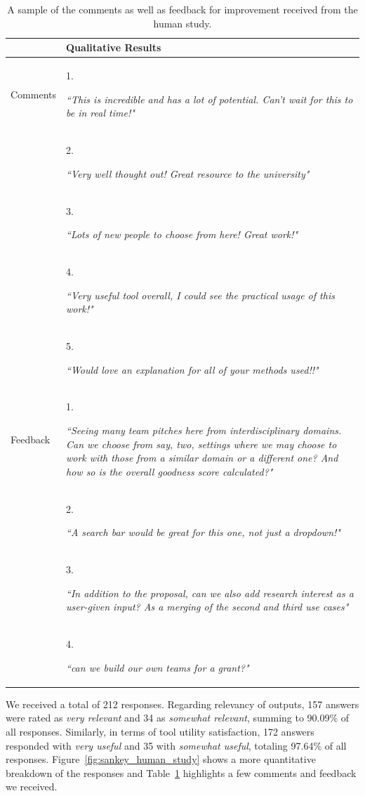 \begin{table}[ht]
{\renewcommand\arraystretch{1.25}
{\begin{tabular}{l|l|l} \hline
& \multicolumn{2}{l}{Qualitative Results} \\ \hline
Comments & \multicolumn{2}{p{6cm}}{1. \raggedright \textit{``This is incredible and has a lot of potential. Can't wait for this to be in real time!"}} \\ 
 & \multicolumn{2}{p{6cm}}{2. \raggedright \textit{``Very well thought out! Great resource to the university"}} \\ 
 & \multicolumn{2}{p{6cm}}{3. \raggedright \textit{``Lots of new people to choose from here! Great work!"}} \\ 
 & \multicolumn{2}{p{6cm}}{4. \raggedright \textit{``Very useful tool  overall, I could see the practical usage of this work!"}} \\ 
 & \multicolumn{2}{p{6cm}}{5. \raggedright \textit{``Would love an explanation for all of your methods used!!"}} \\ 
 \hline
Feedback & \multicolumn{2}{p{6cm}}{1. \raggedright \textit{``Seeing many team pitches here from interdisciplinary domains. Can we choose from say, two, settings where we may choose to work with those from a similar domain or a different one? And how so is the overall goodness score calculated?"}} \\ 
 & \multicolumn{2}{p{6cm}}{2. \raggedright \textit{``A search bar would be great for this one, not just a dropdown!"}} \\ 
 & \multicolumn{2}{p{6cm}}{3. \raggedright \textit{``In addition to the proposal, can we also add research interest as a user-given input? As a merging of the second and third use cases"}} \\ 
 & \multicolumn{2}{p{6cm}}{4. \raggedright \textit{``can we build our own teams for a grant?"}} \\ 
 
\hline
\end{tabular}}}
\caption{A sample of the comments as well as feedback for improvement received from the human study.} \label{tab:comments_feedback}
\end{table}

We received a total of 212 responses. Regarding relevancy of outputs, 157 answers were rated as \textit{very relevant} and 34 as \textit{somewhat relevant}, summing to 90.09\% of all responses. Similarly, in terms of tool utility satisfaction, 172 answers responded with \textit{very useful} and 35 with \textit{somewhat useful}, totaling 97.64\% of all responses. Figure~\ref{fig:sankey_human_study} shows a more quantitative breakdown of the responses and Table~\ref{tab:comments_feedback} highlights a few comments and feedback we received. 

